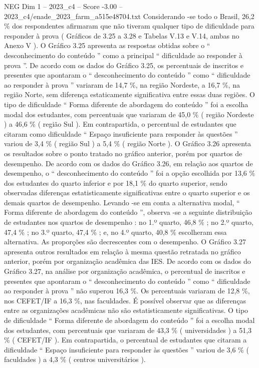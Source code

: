 \begin{textsample}{NEG Dim 1 – 2023\_c4 – Score -3.00 – 2023\_c4/enade\_2023\_farm\_a515e48704.txt}
Considerando -se todo o Brasil, 26,2 \% dos respondentes afirmaram que não tiveram qualquer tipo de dificuldade para responder à prova ( Gráficos de 3.25 a 3.28 e Tabelas V.13 e V.14, ambas no Anexo V ).
O Gráfico 3.25 apresenta as respostas obtidas sobre o “ desconhecimento do conteúdo ” como a principal “ dificuldade ao responder à prova ”.
De acordo com os dados do Gráfico 3.25, os percentuais de inscritos e presentes que apontaram o “ desconhecimento do conteúdo ” como “ dificuldade ao responder à prova ” variaram de 14,7 \%, na região Nordeste, a 16,7 \%, na região Norte, sem diferença estaticamente significativa entre essas duas regiões.
O tipo de dificuldade “ Forma diferente de abordagem do conteúdo ” foi a escolha modal dos estudantes, com percentuais que variaram de 45,0 \% ( região Nordeste ) a 46,6 \% ( região Sul ).
Em contrapartida, o percentual de estudantes que citaram como dificuldade “ Espaço insuficiente para responder às questões ” variou de 3,4 \% ( região Sul ) a 5,4 \% ( região Norte ).
O Gráfico 3.26 apresenta os resultados sobre o ponto tratado no gráfico anterior, porém por quartos de desempenho.
De acordo com os dados do Gráfico 3.26, em relação aos quartos de desempenho, o “ desconhecimento do conteúdo ” foi a opção escolhida por 13,6 \% dos estudantes do quarto inferior e por 18,1 \% do quarto superior, sendo observadas diferenças estatisticamente significativas entre o quarto superior e os demais quartos de desempenho.
Levando -se em conta a alternativa modal, “ Forma diferente de abordagem do conteúdo ”, observa -se a seguinte distribuição de estudantes nos quartos de desempenho : no 1.º quarto, 46,8 \% ; no 2.º quarto, 47,4 \% ; no 3.º quarto, 47,4 \% ; e, no 4.º quarto, 40,8 \% escolheram essa alternativa.
As proporções são decrescentes com o desempenho.
O Gráfico 3.27 apresenta outros resultados em relação à mesma questão retratada no gráfico anterior, porém por organização acadêmica das IES.
De acordo com os dados do Gráfico 3.27, na análise por organização acadêmica, o percentual de inscritos e presentes que apontaram o “ desconhecimento do conteúdo ” como “ dificuldade ao responder à prova ” não superou 16,3 \%.
Os percentuais variaram de 12,8 \%, nos CEFET/IF a 16,3 \%, nas faculdades.
É possível observar que as diferenças entre as organizações acadêmicas não são estatisticamente significativas.
O tipo de dificuldade “ Forma diferente de abordagem do conteúdo ” foi a escolha modal dos estudantes, com percentuais que variaram de 43,3 \% ( universidades ) a 51,3 \% ( CEFET/IF ).
Em contrapartida, o percentual de estudantes que citaram a dificuldade “ Espaço insuficiente para responder às questões ” variou de 3,6 \% ( faculdades ) a 4,3 \% ( centros universitários ).

\end{textsample}
